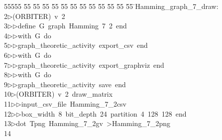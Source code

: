 %
%
\begin{tabbing}
55555 \= 55 \= 55 \= 55 \= 55 \= 55 \= 55 \= 55 \= 55 \= 55 \= 55 \= 55 \= 55 \= \>Hamming\_graph\_7\_draw:\\[0pt]
2\>$\triangleright$\>(ORBITER)\ v\ 2\ \\[0pt]
3\>$\triangleright$\>$\triangleright$\>define\ G\ graph\ Hamming\ 7\ 2\ end\ \\[0pt]
4\>$\triangleright$\>$\triangleright$\>with\ G\ do\ \\[0pt]
5\>$\triangleright$\>$\triangleright$\>graph\_theoretic\_activity\ export\_csv\ end\ \\[0pt]
6\>$\triangleright$\>$\triangleright$\>with\ G\ do\ \\[0pt]
7\>$\triangleright$\>$\triangleright$\>graph\_theoretic\_activity\ export\_graphviz\ end\ \\[0pt]
8\>$\triangleright$\>$\triangleright$\>with\ G\ do\ \\[0pt]
9\>$\triangleright$\>$\triangleright$\>graph\_theoretic\_activity\ save\ end\\[0pt]
10\>$\triangleright$\>(ORBITER)\ v\ 2\ draw\_matrix\ \\[0pt]
11\>$\triangleright$\>$\triangleright$\>input\_csv\_file\ Hamming\_7\_2csv\ \\[0pt]
12\>$\triangleright$\>$\triangleright$\>box\_width\ 8\ bit\_depth\ 24\ partition\ 4\ 128\ 128\ end\\[0pt]
13\>$\triangleright$\>dot\ Tpng\ Hamming\_7\_2gv\ {\textgreater}Hamming\_7\_2png\\[0pt]
14\>\end{tabbing}
